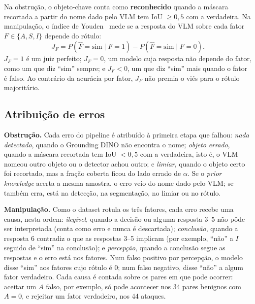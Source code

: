 \documentclass[conference]{IEEEtran}
\begin{document}
Na obstrução, o objeto-chave conta como \textbf{reconhecido} quando a máscara recortada a partir do nome
dado pelo VLM tem IoU $\geq 0{,}5$ com a verdadeira. Na manipulação, o índice de
Youden~\cite{youden1950} mede se a resposta do VLM sobre cada fator $F\in\{A,S,I\}$ depende do rótulo:
\begin{equation}
J_F = P(\hat F=\text{sim}\mid F=1) - P(\hat F=\text{sim}\mid F=0).
\label{eq:youden}
\end{equation}
$J_F=1$ é um juiz perfeito; $J_F=0$, um modelo cuja resposta não depende do fator, como um que diz
``sim'' sempre; e $J_F<0$, um que diz ``sim'' mais quando o fator é falso. Ao contrário da acurácia por
fator, $J_F$ não premia o viés para o rótulo majoritário.

\subsection{Atribuição de erros}
\label{sec:atrib}
\textbf{Obstrução.} Cada erro do pipeline é atribuído à primeira etapa que falhou: \emph{nada
detectado}, quando o Grounding DINO não encontra o nome; \emph{objeto errado}, quando a máscara
recortada tem IoU $<0{,}5$ com a verdadeira, isto é, o VLM nomeou outro objeto ou o detector achou outro;
e \emph{limiar}, quando o objeto certo foi recortado, mas a fração coberta ficou do lado errado de
$\alpha$. Se o \emph{prior knowledge} acerta a mesma amostra, o erro veio do nome dado pelo VLM; se também
erra, está na detecção, na segmentação, no limiar ou no rótulo.

\textbf{Manipulação.} Como o dataset rotula os três fatores, cada erro recebe uma causa, nesta ordem:
\emph{ilegível}, quando a decisão ou alguma resposta 3--5 não pôde ser interpretada (conta como erro e
nunca é descartada); \emph{conclusão}, quando a resposta 6 contradiz o que as respostas 3--5 implicam
(por exemplo, ``não'' a $I$ seguido de ``sim'' na conclusão); e \emph{percepção}, quando a conclusão segue
as respostas e o erro está nos fatores. Num falso positivo por percepção, o modelo disse ``sim'' aos
fatores cujo rótulo é 0; num falso negativo, disse ``não'' a algum fator verdadeiro. Cada causa é contada
sobre os pares em que pode ocorrer: aceitar um $A$ falso, por exemplo, só pode acontecer nos 34 pares
benignos com $A=0$, e rejeitar um fator verdadeiro, nos 44 ataques.
\end{document}

